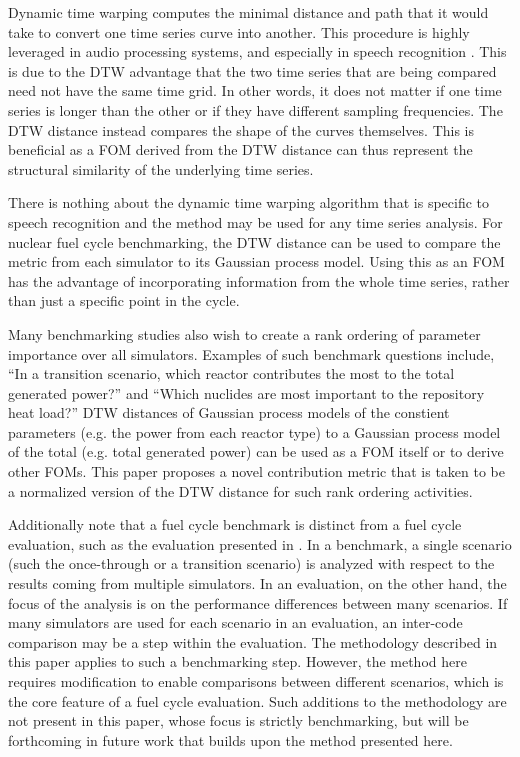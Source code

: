 \documentclass{ntmanuscript}
\begin{document}
Dynamic time warping computes the minimal distance and path that it would
take to convert one time series curve into another. This procedure is highly
leveraged in audio processing systems, and especially in speech recognition
\cite{myers1980performance,muda2010voice}.
This is due to the DTW advantage that the two time series that are being
compared need not have the same time grid. In other words, it does not matter
if one time series is longer than
the other or if they have different sampling frequencies. The DTW distance
instead compares the shape of the curves themselves. This is beneficial as
a FOM derived from the DTW distance can thus represent the structural
similarity of the underlying time series.


There is nothing about the dynamic time warping algorithm that is specific
to speech recognition and the method
may be used for any time series analysis. For nuclear fuel cycle benchmarking,
the DTW distance can be used to compare the metric from each simulator to its
Gaussian process model. Using this as an FOM has the advantage of
incorporating information from the whole time series, rather than just a
specific point in the cycle.

Many benchmarking studies also wish to create a rank ordering of parameter
importance over all simulators. Examples of such benchmark questions include,
``In a transition scenario,
which reactor contributes the most to the total generated power?'' and
``Which
nuclides are most important to the repository heat load?'' DTW distances
of Gaussian process models of the constient parameters (e.g. the power from
each reactor type) to a Gaussian process model of the total (e.g. total
generated power) can be used as a FOM itself or to derive other FOMs.
This paper proposes a novel contribution metric
that is taken to be a normalized version of the DTW
distance for such rank ordering activities.

Additionally note that a fuel cycle benchmark is distinct from a
fuel cycle evaluation, such as the evaluation presented in
\cite{wigeland2014nuclear}.
In a benchmark, a single scenario (such the once-through or a transition
scenario) is analyzed with respect to the results coming from multiple
simulators. In an evaluation, on the other hand, the focus of the analysis
is on the performance differences between many scenarios. If many simulators
are used for each scenario in an evaluation, an inter-code comparison may
be a step within the evaluation. The methodology described in this paper
applies to such a benchmarking step. However,
the method here requires modification to enable comparisons
between different scenarios, which is the core feature of a fuel cycle evaluation.
Such additions to the methodology
are not present in this paper, whose focus is strictly benchmarking, but will
be forthcoming in future work that builds upon the method presented here.
\end{document}
